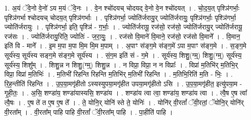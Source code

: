 \documentclass[17pt]{extarticle}
\begin{document}
1. अ॒यं ॅवे॒नो वे॒नो॑ ऽय म॒यं ॅवे॒नः । . वे॒न श्चो॑दयच् चोदयद् वे॒नो वे॒न श्चो॑दयत् । . चो॒द॒य॒त् पृश्ञि॑गर्भाः॒ पृश्ञि॑गर्भा श्चोदयच् चोदय॒त् पृश्ञि॑गर्भाः । . पृश्ञि॑गर्भा॒ ज्योति॑र्जरायु॒र् ज्योति॑र्जरायुः॒ पृश्ञि॑गर्भाः॒ पृश्ञि॑गर्भा॒ ज्योति॑र्जरायुः । . पृश्ञि॑गर्भा॒ इति॒ पृश्ञि॑ - ग॒र्भाः॒ । . ज्योति॑र्जरायू॒ रज॑सो॒ रज॑सो॒ ज्योति॑र्जरायु॒र् ज्योति॑र्जरायू॒ रज॑सः । . ज्योति॑र्जरायु॒रिति॒ ज्योतिः॑ - ज॒रा॒युः॒ । . रज॑सो वि॒माने॑ वि॒माने॒ रज॑सो॒ रज॑सो वि॒माने᳚ । . वि॒मान॒ इति॑ वि - माने᳚ । . इ॒म म॒पा म॒पा मि॒म मि॒म म॒पाम् । . अ॒पाꣳ स॑ङ्ग॒मे स॑ङ्ग॒मे॑ ऽपा म॒पाꣳ स॑ङ्ग॒मे । . स॒ङ्ग॒मे सूर्य॑स्य॒ सूर्य॑स्य सङ्ग॒मे स॑ङ्ग॒मे सूर्य॑स्य । . सं॒ग॒म इति॑ सं - ग॒मे । . सूर्य॑स्य॒ शिशु॒(ग्म्॒) शिशु॒(ग्म्॒) सूर्य॑स्य॒ सूर्य॑स्य॒ शिशु᳚म् । . शिशु॒न्न न शिशु॒(ग्म्॒) शिशु॒न्न । . न विप्रा॒ विप्रा॒ न न विप्राः᳚ । . विप्रा॑ म॒तिभि॑र् म॒तिभि॒र् विप्रा॒ विप्रा॑ म॒तिभिः॑ । . म॒तिभी॑ रिहन्ति रिहन्ति म॒तिभि॑र् म॒तिभी॑ रिहन्ति । . म॒तिभि॒रिति॑ म॒ति - भिः॒ । . रि॒ह॒न्तीति॑ रिहन्ति । . उ॒प॒या॒मगृ॑हीतो ऽस्यस्युपया॒मगृ॑हीत उपया॒मगृ॑हीतो ऽसि । . उ॒प॒या॒मगृ॑हीत॒ इत्यु॑पया॒म - गृ॒ही॒तः॒ । . अ॒सि॒ शण्डा॑य॒ शण्डा॑यास्यसि॒ शण्डा॑य । . शण्डा॑य त्वा त्वा॒ शण्डा॑य॒ शण्डा॑य त्वा । . त्वै॒ष ए॒ष त्वा᳚ त्वै॒षः । . ए॒ष ते॑ त ए॒ष ए॒ष ते᳚ । . ते॒ योनि॒र् योनि॑ स्ते ते॒ योनिः॑ । . योनि॑र् वी॒रतां᳚ ॅवी॒रतां॒ ॅयोनि॒र् योनि॑र् वी॒रता᳚म् । . वी॒रता᳚म् पाहि पाहि वी॒रतां᳚ ॅवी॒रता᳚म् पाहि । . पा॒हीति॑ पाहि । \newline
\end{document}
